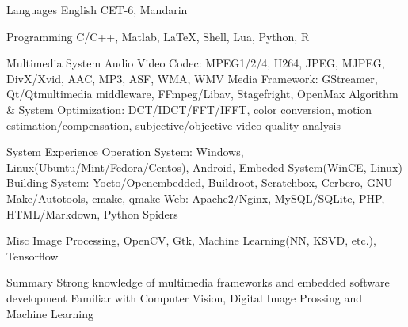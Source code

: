 
\begin{cvskills}
  \cvskill
    {Languages} %
    {English CET-6, Mandarin} %

  \cvskill
    {Programming} %
    {C/C++, Matlab, LaTeX, Shell, Lua, Python, R} %

  \cvskill
    {Multimedia System} %
    {Audio Video Codec: MPEG1/2/4, H264, JPEG, MJPEG, DivX/Xvid, AAC, MP3, ASF, WMA, WMV \newline
    Media Framework: GStreamer, Qt/Qtmultimedia middleware, FFmpeg/Libav, Stagefright, OpenMax \newline
    Algorithm \& System Optimization: DCT/IDCT/FFT/IFFT, color conversion, \newline motion estimation/compensation, subjective/objective video quality analysis} %

  \cvskill
    {System Experience} %
    {Operation System: Windows, Linux(Ubuntu/Mint/Fedora/Centos), Android, \newline
    Embeded System(WinCE, Linux) \newline
    Building System: Yocto/Openembedded, Buildroot, Scratchbox, Cerbero, \newline
    GNU Make/Autotools, cmake, qmake \newline
    Web: Apache2/Nginx, MySQL/SQLite, PHP, HTML/Markdown, Python Spiders} %

  \cvskill
    {Misc} %
    {Image Processing, OpenCV, Gtk, Machine Learning(NN, KSVD, etc.), Tensorflow}

  \cvskill
    {Summary} %
    {Strong knowledge of multimedia frameworks and embedded software development \newline
     Familiar with Computer Vision, Digital Image Prossing and Machine Learning}

\end{cvskills}
